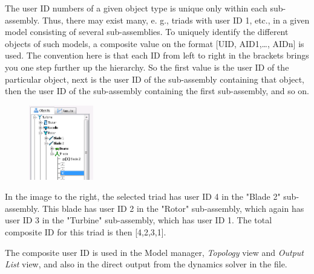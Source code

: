 
The user ID numbers of a given object type is unique only within each
sub-assembly. Thus, there may exist many, e. g., triads with user ID 1,
etc., in a given model consisting of several sub-assemblies. To uniquely
identify the different objects of such models, a composite value on the
format {[}UID, AID1,\ldots, AIDn{]} is used. The convention here is that
each ID from left to right in the brackets brings you one step further
up the hierarchy. So the first value is the user ID of the particular
object, next is the user ID of the sub-assembly containing that object,
then the user ID of the sub-assembly containing the first sub-assembly,
and so on.

\begin{figure}
  \includegraphics[width=0.25\textwidth]{Figures/4-hierarchy}
\end{figure}

In the image to the right, the selected triad has user ID 4 in the "Blade 2"
sub-assembly. This blade has user ID 2 in the "Rotor" sub-assembly,
which again has user ID 3 in the "Turbine" sub-assembly, which has user ID 1.
The total composite ID for this triad is then [4,2,3,1].

The composite user ID is used in the Model manager, {\sl Topology} view and
{\sl Output List} view, and also in the direct output from the dynamics solver
in the  file.

\clearpage
{}
